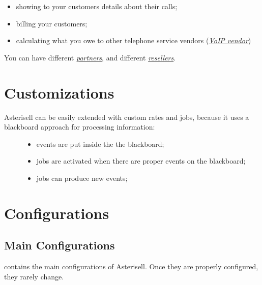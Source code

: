\documentclass[letterpaper,10pt,english]{sphinxmanual}
\begin{document}
\begin{description}
\begin{itemize}
\item {} 
showing to your customers details about their calls;

\item {} 
billing your customers;

\item {} 
calculating what you owe to other telephone service vendors ({\hyperref[index:term-voip-vendor]{\emph{VoIP vendor}}})

\end{itemize}

\end{description}

You can have different {\hyperref[index:term-partner]{\emph{partners}}}, and different {\hyperref[index:term-reseller]{\emph{resellers}}}.


\chapter{Customizations}
\label{index:asterisell-customizations}\label{index:customizations}\begin{description}
\item[{Asterisell can be easily extended with custom rates and jobs, because it uses a blackboard approach for processing information:}] \leavevmode\begin{itemize}
\item {} 
events are put inside the the blackboard;

\item {} 
jobs are activated when there are proper events on the blackboard;

\item {} 
jobs can produce new events;

\end{itemize}

\end{description}


\chapter{Configurations}
\label{index:configurations}

\section{Main Configurations}
\label{index:main-configurations}\label{index:id1}
 contains the main configurations of Asterisell. Once they are properly configured, they rarely change.
\end{document}
